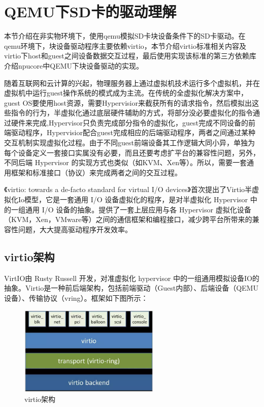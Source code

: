 \section{QEMU下SD卡的驱动理解}

本节介绍在非实物环境下，使用qemu模拟SD卡块设备条件下的SD卡驱动。在qemu环境下，块设备驱动程序主要依赖virtio，本节介绍virtio标准相关内容及virtio下host和guest之间设备数据交互过程，最后使用实现该标准的第三方依赖库介绍npucore中QEMU下块设备驱动的实现。


随着互联网和云计算的兴起，物理服务器上通过虚拟机技术运行多个虚拟机，并在虚拟机中运行guest操作系统的模式成为主流。在传统的全虚拟化解决方案中，guest OS要使用host资源，需要Hypervisior来截获所有的请求指令，然后模拟出这些指令的行为，半虚拟化通过底层硬件辅助的方式，将部分没必要虚拟化的指令通过硬件来完成,Hypervisor只负责完成部分指令的虚拟化，guest完成不同设备的前端驱动程序，Hypervisior配合guest完成相应的后端驱动程序，两者之间通过某种交互机制实现虚拟化过程。由于不同guest前端设备其工作逻辑大同小异，单独为每个设备定义一套接口实属没有必要，而且还要考虑扩平台的兼容性问题，另外，不同后端 Hypervisor 的实现方式也类似（如KVM、Xen等）。所以，需要一套通用框架和标准接口（协议）来完成两者之间的交互过程。


《virtio: towards a de-facto standard for virtual I/O devices》首次提出了Virtio半虚拟化Io模型，它是一套通用 I/O 设备虚拟化的程序，是对半虚拟化 Hypervisor 中的一组通用 I/O 设备的抽象。提供了一套上层应⽤与各 Hypervisor 虚拟化设备（KVM，Xen，VMware等）之间的通信框架和编程接口，减少跨平台所带来的兼容性问题，大大提高驱动程序开发效率。

\subsection{virtio架构}

VirtIO由 Rusty Russell 开发，对准虚拟化 hypervisor 中的一组通用模拟设备IO的抽象。Virtio是一种前后端架构，包括前端驱动（Guest内部）、后端设备（QEMU设备）、传输协议（vring）。框架如下图所示：

\begin{figure}[H]
	\centering
	\includegraphics[width=0.6\textwidth]{figures/06-03-1.png}
	\caption{virtio架构}
\end{figure}


